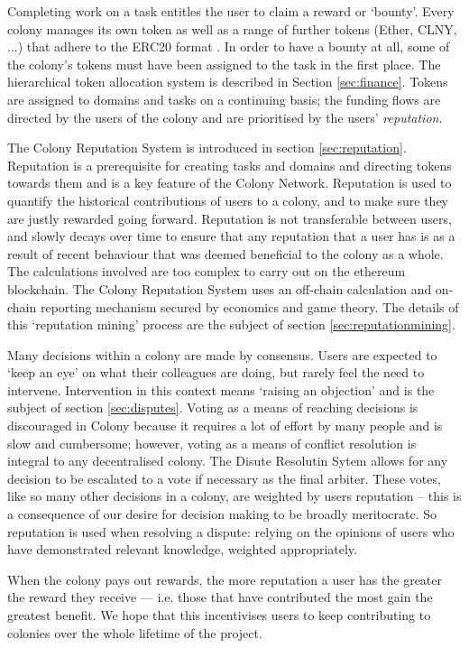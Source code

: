 Completing work on a task entitles the user to claim a reward or `bounty'. Every colony manages its own token as well as a range of further tokens (Ether, CLNY, ...) that adhere to the ERC20 format \cite{erc20}. In order to have a bounty at all, some of the colony's tokens must have been assigned to the task in the first place. The hierarchical token allocation system is described in Section \ref{sec:finance}. Tokens are assigned to domains and tasks on a continuing basis; the funding flows are directed by the users of the colony and are prioritised by the users' \emph{reputation}. 

The Colony Reputation System is introduced in section \ref{sec:reputation}. Reputation is a prerequisite for creating tasks and domains and directing tokens towards them and is a key feature of the Colony Network. Reputation is used to quantify the historical contributions of users to a colony, and to make sure they are justly rewarded going forward. Reputation is not transferable between users, and slowly decays over time to ensure that any reputation that a user has is as a result of recent behaviour that was deemed beneficial to the colony as a whole. The calculations involved are too complex to carry out on the ethereum blockchain. The Colony Reputation System uses an off-chain calculation and on-chain reporting mechanism secured by economics and game theory. The details of this `reputation mining' process are the subject of section \ref{sec:reputationmining}.

Many decisions within a colony are made by consensus. Users are expected to `keep an eye' on what their colleagues are doing, but rarely feel the need to intervene. Intervention in this context means `raising an objection' and is the subject of section \ref{sec:disputes}. Voting as a means of reaching decisions is discouraged in Colony because it requires a lot of effort by many people and is slow and cumbersome; however, voting as a means of conflict resolution is integral to any decentralised colony. The Disute Resolutin Sytem allows for any decision to be escalated to a vote if necessary as the final arbiter. These votes, like so many other decisions in a colony, are weighted by users reputation -- this is a consequence of our desire for decision making to be broadly meritocratc. So reputation is used when resolving a dispute: relying on the opinions of users who have demonstrated relevant knowledge, weighted appropriately. 


When the colony pays out rewards, the more reputation a user has the greater the reward they receive --- i.e. those that have contributed the most gain the greatest benefit. We hope that this incentivises users to keep contributing to colonies over the whole lifetime of the project.
